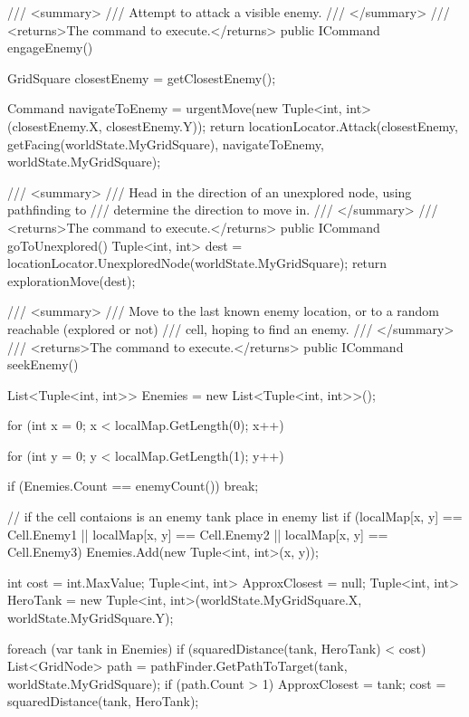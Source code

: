 \documentclass[11pt]{article}
\begin{document}
\begin{code}
{{        /// <summary>
        /// Attempt to attack a visible enemy.
        /// </summary>
        /// <returns>The command to execute.</returns>
        public ICommand engageEnemy()
        {
            GridSquare closestEnemy = getClosestEnemy();

            Command navigateToEnemy = urgentMove(new Tuple<int, int>(closestEnemy.X, closestEnemy.Y));
            return locationLocator.Attack(closestEnemy,
               getFacing(worldState.MyGridSquare), navigateToEnemy, worldState.MyGridSquare);
        }

        /// <summary>
        /// Head in the direction of an unexplored node, using pathfinding to
        /// determine the direction to move in.
        /// </summary>
        /// <returns>The command to execute.</returns>
        public ICommand goToUnexplored()
        {
            Tuple<int, int> dest = locationLocator.UnexploredNode(worldState.MyGridSquare);
            return explorationMove(dest);
        }

        /// <summary>
        /// Move to the last known enemy location, or to a random reachable (explored or not)
        /// cell, hoping to find an enemy.
        /// </summary>
        /// <returns>The command to execute.</returns>
        public ICommand seekEnemy()
        {
            List<Tuple<int, int>> Enemies = new List<Tuple<int, int>>();

            for (int x = 0; x < localMap.GetLength(0); x++)
            {
                for (int y = 0; y < localMap.GetLength(1); y++)
                {

                    if (Enemies.Count == enemyCount())
                    {
                        break;
                    }

                    // if the cell contaions is an enemy tank place in enemy list
                    if (localMap[x, y] == Cell.Enemy1 || localMap[x, y] == Cell.Enemy2 || localMap[x, y] == Cell.Enemy3)
                    {
                        Enemies.Add(new Tuple<int, int>(x, y));
                    }
                }
            }
            
            int cost = int.MaxValue;
            Tuple<int, int> ApproxClosest = null;
            Tuple<int, int> HeroTank = new Tuple<int, int>(worldState.MyGridSquare.X, worldState.MyGridSquare.Y);

            foreach (var tank in Enemies)
            {
                if (squaredDistance(tank, HeroTank) < cost)
                {
                    List<GridNode> path = pathFinder.GetPathToTarget(tank,
                        worldState.MyGridSquare);
                    if (path.Count > 1)
                    {
                        ApproxClosest = tank;
                        cost = squaredDistance(tank, HeroTank);
                    }
                }
            }
            
}}}
\end{code}
\end{document}
